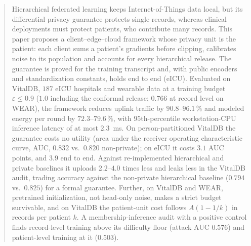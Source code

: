 \begin{abstract}
Hierarchical federated learning keeps Internet-of-Things data local, but its
differential-privacy guarantee protects single records, whereas clinical
deployments must protect patients, who contribute many records.
This paper proposes a client--edge--cloud framework whose privacy unit is the
patient: each client sums a patient's gradients before clipping, calibrates
noise to its population and accounts for every hierarchical release. The
guarantee is proved for the training transcript and, with public encoders and
standardization constants, holds end to end (eICU). Evaluated on VitalDB,
$187$ eICU hospitals and wearable data at a training budget
$\varepsilon \le 0.9$ ($1.0$ including the conformal release; $0.766$ at record
level on WEAR), the framework reduces uplink traffic by $90.8$--$96.1\,\%$ and
modeled energy per round by $72.3$--$79.6\,\%$, with $95$th-percentile
workstation-CPU inference latency of at most $2.3$~ms. On person-partitioned
VitalDB the guarantee costs no utility (area under the receiver operating
characteristic curve, AUC, $0.832$ vs.\ $0.820$ non-private); on eICU it costs
$3.1$ AUC points, and $3.9$ end to end. Against re-implemented hierarchical
and private baselines it uploads $2.2$--$4.0$ times less and leaks less in the
VitalDB audit, trading accuracy against the non-private hierarchical
baseline ($0.794$ vs.\ $0.825$) for a formal guarantee. Further, on VitalDB
and WEAR,
pretrained initialization, not head-only noise, makes a strict budget
survivable, and on VitalDB the patient-unit cost follows $A(1 - 1/k)$ in records per
patient $k$. A membership-inference audit with a positive control finds
record-level training above its difficulty floor (attack AUC $0.576$) and
patient-level training at it ($0.503$).
\end{abstract}
